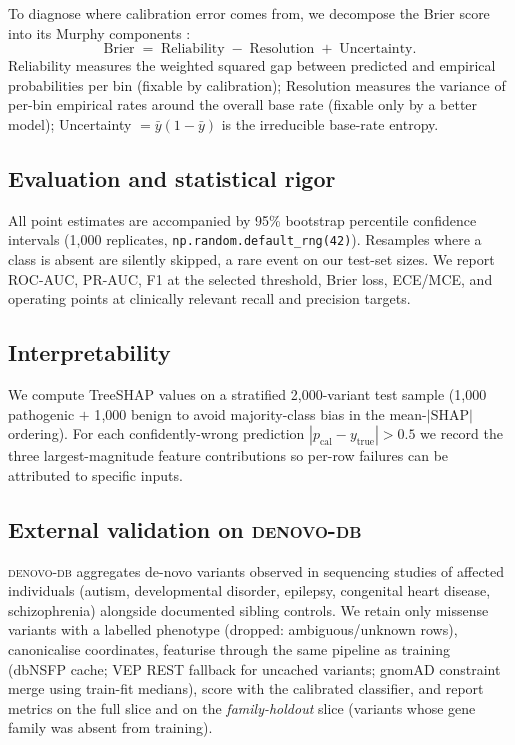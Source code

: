 \documentclass[11pt,a4paper]{article}
\begin{document}
To diagnose where calibration error comes from, we decompose the
Brier score into its Murphy components
\citep{murphy1973brier}:
\[
    \text{Brier} \;=\; \text{Reliability} \;-\; \text{Resolution} \;+\; \text{Uncertainty}.
\]
Reliability measures the weighted squared gap between predicted
and empirical probabilities per bin (fixable by calibration);
Resolution measures the variance of per-bin empirical rates around
the overall base rate (fixable only by a better model);
Uncertainty \(= \bar{y}(1-\bar{y})\) is the irreducible base-rate
entropy.

\subsection{Evaluation and statistical rigor}

All point estimates are accompanied by 95\% bootstrap percentile
confidence intervals (1{,}000 replicates,
\texttt{np.random.default\_rng(42)}). Resamples where a class is
absent are silently skipped, a rare event on our test-set sizes.
We report ROC-AUC, PR-AUC, F1 at the selected threshold, Brier
loss, ECE/MCE, and operating points at clinically relevant recall
and precision targets.

\subsection{Interpretability}
\label{sec:methods-shap}

We compute TreeSHAP values \citep{lundberg2017shap} on a
stratified 2{,}000-variant test sample (1{,}000 pathogenic
\(+\) 1{,}000 benign to avoid majority-class bias in the
mean-\(|\text{SHAP}|\) ordering). For each confidently-wrong
prediction \(|p_{\text{cal}} - y_{\text{true}}| > 0.5\) we record
the three largest-magnitude feature contributions so per-row
failures can be attributed to specific inputs.

\subsection{External validation on \textsc{denovo-db}}
\label{sec:methods-denovo}

\textsc{denovo-db} \citep{turakhia2016denovodb} aggregates de-novo
variants observed in sequencing studies of affected individuals
(autism, developmental disorder, epilepsy, congenital heart
disease, schizophrenia) alongside documented sibling controls.
We retain only missense variants with a labelled phenotype
(dropped: ambiguous/unknown rows), canonicalise coordinates,
featurise through the same pipeline as training (dbNSFP cache;
VEP REST fallback for uncached variants; gnomAD constraint merge
using train-fit medians), score with the calibrated classifier,
and report metrics on the full slice and on the
\emph{family-holdout} slice (variants whose gene family was
absent from training).
\end{document}
